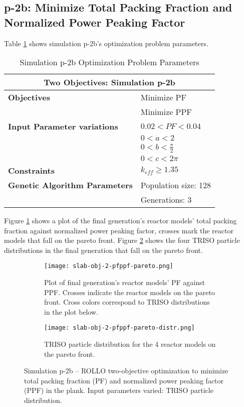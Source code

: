 \subsection{p-2b: Minimize Total Packing Fraction and Normalized Power Peaking Factor}
Table \ref{tab:simulationp2b} shows simulation p-2b's optimization problem parameters. 
\begin{table}[htbp]
    \centering
    \onehalfspacing
    \caption{Simulation p-2b Optimization Problem Parameters}
	\label{tab:simulationp2b}
    \footnotesize
    \begin{tabular}{l|p{3cm}}
    \hline 
    \multicolumn{2}{c}{\textbf{Two Objectives: Simulation p-2b}} \\
    \hline 
    \textbf{Objectives} & Minimize PF \\
    & Minimize PPF \\
    \hline 
    \textbf{Input Parameter variations} & $0.02<PF<0.04$ \\
    & $0<a<2$ \\
    & $0<b<\frac{\pi}{2}$ \\
    & $0<c<2\pi$ \\
    \hline
    \textbf{Constraints} & $k_{eff} \geq 1.35$\\ 
    \hline 
    \textbf{Genetic Algorithm Parameters} & Population size: 128 \\
    & Generations: 3 \\
    \hline
    \end{tabular}
\end{table}
Figure \ref{fig:slab-obj-2-pfppf-pareto} shows a plot of the final generation's reactor models' 
total packing fraction against normalized power peaking factor, crosses mark the reactor 
models that fall on the pareto front.
Figure \ref{fig:slab-obj-2-pfppf-pareto-distr} shows the four TRISO particle distributions in 
the final generation that fall on the pareto front. 
\begin{figure}[htbp]
    \centering
    \begin{subfigure}{\textwidth}
        \texttt{[image: slab-obj-2-pfppf-pareto.png]}
        \caption{Plot of final generation's reactor models' PF against PPF. 
        Crosses indicate the reactor models on the pareto front. Cross colors correspond  
        to TRISO distributions in the plot below.}
        \label{fig:slab-obj-2-pfppf-pareto} 
    \end{subfigure}
    \begin{subfigure}{\textwidth}
        \texttt{[image: slab-obj-2-pfppf-pareto-distr.png]}
        \caption{TRISO particle distribution for the 4 reactor models on the pareto front.}
        \label{fig:slab-obj-2-pfppf-pareto-distr} 
    \end{subfigure}
    \caption{Simulation p-2b -- ROLLO two-objective optimization to minimize total packing fraction (PF) and  
    normalized power peaking factor (PPF) in the plank. Input parameters varied: 
    TRISO particle distribution.}
    \label{fig:slab-obj-2-pfppf}
\end{figure}
